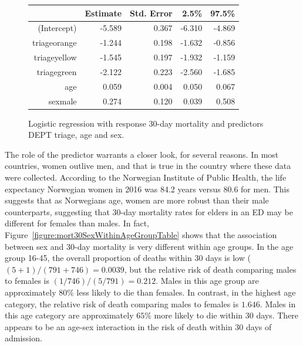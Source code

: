 \begin{figure}[ht]
\centering
\begin{tabular}{rrrrr}
  \hline
  & Estimate & Std. Error & 2.5\% & 97.5\% \\
  \hline
  (Intercept) & -5.589 & 0.367 & -6.310 & -4.869  \\
  triageorange & -1.244 & 0.198 & -1.632 & -0.856  \\
  triageyellow & -1.545 & 0.197 & -1.932 & -1.159  \\
  triagegreen & -2.122 & 0.223 & -2.560 & -1.685\\
  age & 0.059 & 0.004 & 0.050 & 0.067  \\
  sexmale & 0.274 & 0.120 & 0.039 & 0.508  \\
   \hline
\end{tabular}
\caption{Logistic regression with response 30-day mortality and
       predictors DEPT triage, age and sex.}
\label{figure:triageAgeSexMort30logreg}
\end{figure}

The role of the predictor  warrants a closer look, for several reasons.  In most countries, women outlive men, and that is true in the country where these data were collected.  According to the Norwegian Institute of Public Health,  the life expectancy Norwegian women in 2016 was 84.2 years versus 80.6 for men.  This suggests that as Norwegians age, women are more robust than their male counterparts, suggesting that 30-day mortality rates for elders in an ED may be different for females than males.  In fact, Figure~\ref{figure:mort30SexWithinAgeGroupTable} shows that the association between sex and 30-day mortality is very different within age groups.  In the age group 16-45, the overall proportion of deaths within 30 days is low ($(5 + 1)/(791 + 746) = 0.0039$, but the relative risk of death comparing males to females is $(1/746)/(5/791) = 0.212$.  Males in this age group are approximately $80\%$ less likely to die than females.  In contrast, in the highest age category, the relative risk of death comparing males to females is $1.646$.  Males in this age category are approximately $65\%$ more likely to die within 30 days.  There appears to be an age-sex interaction in the risk of death within 30 days of admission.  

